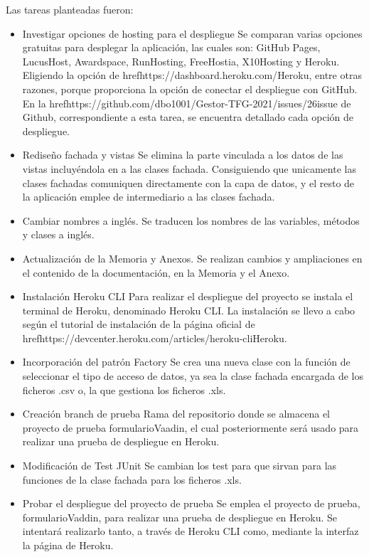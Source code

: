 Las tareas planteadas fueron:
\begin{itemize}
	\tightlist
	\item Investigar opciones de hosting para el despliegue
		Se comparan varias opciones gratuitas para desplegar la aplicación, las cuales son: GitHub Pages, LucusHost, Awardspace, RunHosting, FreeHostia, X10Hosting y Heroku. Eligiendo la opción de href{https://dashboard.heroku.com/}{Heroku}, entre otras razones, porque proporciona la opción de conectar el despliegue con GitHub. En la href{https://github.com/dbo1001/Gestor-TFG-2021/issues/26}{issue de Github}, correspondiente a esta tarea, se encuentra detallado cada opción de despliegue.
	\item Rediseño fachada y vistas
		Se elimina la parte vinculada a los datos de las vistas incluyéndola en a las clases fachada. Consiguiendo que unicamente las clases fachadas comuniquen directamente con la capa de datos, y el resto de la aplicación emplee de intermediario a las clases fachada.
	\item Cambiar nombres a inglés.
		Se traducen los nombres de las variables, métodos y clases a inglés.
	\item Actualización de la Memoria y Anexos.
		Se realizan cambios y ampliaciones en el contenido de la documentación, en la Memoria y el Anexo.
	\item Instalación Heroku CLI
		Para realizar el despliegue del proyecto se instala el terminal de Heroku, denominado Heroku CLI. La instalación se llevo a cabo según el tutorial de instalación de la página oficial de href{https://devcenter.heroku.com/articles/heroku-cli}{Heroku}.
	\item Incorporación del patrón Factory 
		Se crea una nueva clase con la función de seleccionar el tipo de acceso de datos, ya sea la clase fachada encargada de los ficheros .csv o, la que gestiona los ficheros .xls.
	\item Creación branch de prueba
		Rama del repositorio donde se almacena el proyecto de prueba formularioVaadin, el cual posteriormente será usado para realizar una prueba de despliegue en Heroku.
	\item Modificación de Test JUnit
		Se cambian los test para que sirvan para las funciones de la clase fachada para los ficheros .xls. 
	\item Probar el despliegue del proyecto de prueba
		Se emplea el proyecto de prueba, formularioVaddin, para realizar una prueba de despliegue en Heroku. Se intentará realizarlo tanto, a través de Heroku CLI como, mediante la interfaz la página de Heroku.
	
\end{itemize}

